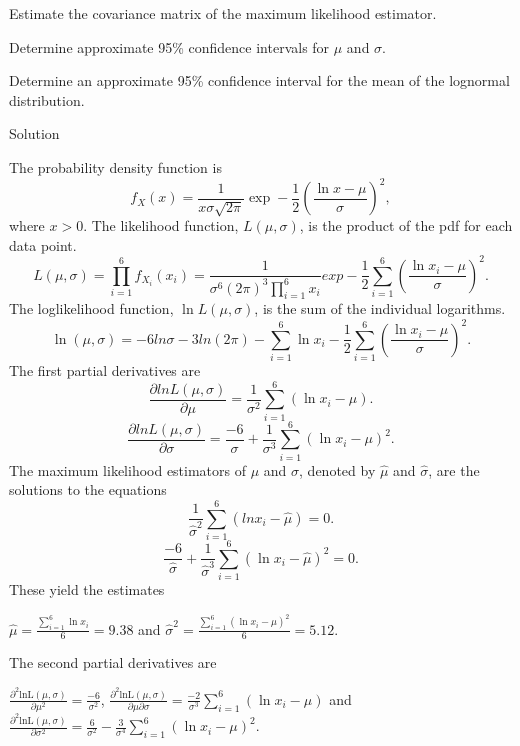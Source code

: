 \documentclass[]{book}
\theoremstyle{definition}
\theoremstyle{definition}
\theoremstyle{definition}
\theoremstyle{remark}
\begin{document}
Estimate the covariance matrix of the maximum likelihood estimator.

Determine approximate 95\% confidence intervals for \(\mu\) and
\(\sigma\).

Determine an approximate 95\% confidence interval for the mean of the
lognormal distribution.

Solution

The probability density function is
\[f_{X}\left( x \right) = \frac{1}{x \sigma \sqrt{2\pi}}\exp - \frac{1}{2}\left( \frac{\ln x - \mu}{\sigma} \right)^{2},\]
where \(x > 0\). The likelihood function,
\(L\left( \mu,\sigma \right)\), is the product of the pdf for each data
point.
\[L\left( \mu,\sigma \right) = \prod_{i = 1}^{6}{f_{X_{i}}\left( x_{i} \right)} = \frac{1}{\sigma^{6}\left( 2\pi \right)^{3}\prod_{i = 1}^{6}x_{i}}exp - \frac{1}{2}\sum_{i = 1}^{6}\left( \frac{\ln x_{i} - \mu}{\sigma} \right)^{2}.\]
The loglikelihood function, \(\ln L \left( \mu,\sigma \right)\), is the
sum of the individual logarithms.
\[\ln \left( \mu,\sigma \right) = - 6ln\sigma - 3ln\left( 2\pi \right) - \sum_{i = 1}^{6}\ln x_{i} - \frac{1}{2}\sum_{i = 1}^{6}\left( \frac{\ln x_{i} - \mu}{\sigma} \right)^{2}.\]
The first partial derivatives are
\[\frac{\partial lnL\left( \mu,\sigma \right)}{\partial\mu} = \frac{1}{\sigma^{2}}\sum_{i = 1}^{6}\left( \ln x_{i} - \mu \right).\]
\[\frac{\partial lnL\left( \mu,\sigma \right)}{\partial\sigma} = \frac{- 6}{\sigma} + \frac{1}{\sigma^{3}}\sum_{i = 1}^{6}\left( \ln x_{i} - \mu \right)^{2}.\]
The maximum likelihood estimators of \(\mu\) and \(\sigma\), denoted by
\(\hat{\mu}\) and \(\hat{\sigma}\), are the solutions to the equations
\[\frac{1}{{\hat{\sigma}}^{2}}\sum_{i = 1}^{6}\left( lnx_{i} - \hat{\mu} \right) = 0.\]
\[\frac{- 6}{\hat{\sigma}} + \frac{1}{{\hat{\sigma}}^{3}}\sum_{i = 1}^{6}\left( \ln x_{i} - \hat{\mu} \right)^{2} = 0.\]
These yield the estimates

\(\hat{\mu} = \frac{\sum_{i = 1}^{6}{\ln x_{i}}}{6} = 9.38\) and
\({\hat{\sigma}}^{2} = \frac{\sum_{i = 1}^{6}\left( \ln x_{i} - \hat{\mu} \right)^{2}}{6} = 5.12\).

The second partial derivatives are

\(\frac{\partial^{2}\text{lnL}\left( \mu,\sigma \right)}{\partial\mu^{2}} = \frac{- 6}{\sigma^{2}}\),
\(\frac{\partial^{2}\text{lnL}\left( \mu,\sigma \right)}{\partial\mu\partial\sigma} = \frac{- 2}{\sigma^{3}}\sum_{i = 1}^{6}\left( \ln x_{i} - \mu \right)\)
and
\(\frac{\partial^{2}\text{lnL}\left( \mu,\sigma \right)}{\partial\sigma^{2}} = \frac{6}{\sigma^{2}} - \frac{3}{\sigma^{4}}\sum_{i = 1}^{6}\left( \ln x_{i} - \mu \right)^{2}\).
\end{document}
